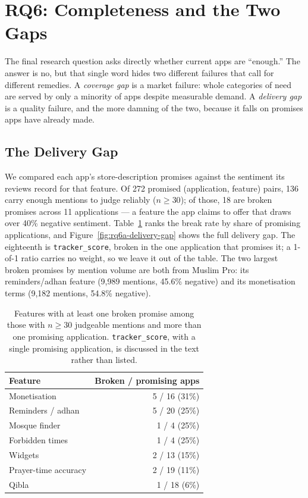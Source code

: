 
\section{RQ6: Completeness and the Two Gaps}
\label{sec:rq6}

The final research question asks directly whether current apps are ``enough.''
The answer is no, but that single word hides two different failures that call
for different remedies. A \emph{coverage gap} is a market failure: whole
categories of need are served by only a minority of apps despite measurable
demand. A \emph{delivery gap} is a quality failure, and the more damning of the
two, because it falls on promises apps have already made.

\subsection{The Delivery Gap}

We compared each app's store-description promises against the sentiment its
reviews record for that feature. Of 272 promised (application, feature)
pairs, 136 carry enough mentions to judge reliably (\(n \geq 30\)); of those,
18 are broken promises across 11 applications --- a feature the app claims to
offer that draws over 40\% negative sentiment. Table~\ref{tab:rq6-broken} ranks
the break rate by share of promising applications, and
Figure~\ref{fig:rq6a-delivery-gap} shows the full delivery gap. The
eighteenth is \texttt{tracker\_score}, broken in the one application that
promises it; a 1-of-1 ratio carries no weight, so we leave it out of the
table. The two largest broken promises by mention volume are both from Muslim
Pro: its reminders/adhan feature (9,989 mentions, 45.6\% negative) and its
monetisation terms (9,182 mentions, 54.8\% negative).

\begin{table}[t]
  \centering
  \small
  \caption{Features with at least one broken promise among those with \(n \geq 30\) judgeable mentions and more than one promising application. \texttt{tracker\_score}, with a single promising application, is discussed in the text rather than listed.}
  \label{tab:rq6-broken}
  \begin{tabular}{lr}
    \toprule
    Feature & Broken / promising apps \\
    \midrule
    Monetisation             & 5 / 16 (31\%) \\
    Reminders / adhan        & 5 / 20 (25\%) \\
    Mosque finder             & 1 / 4 (25\%) \\
    Forbidden times            & 1 / 4 (25\%) \\
    Widgets                    & 2 / 13 (15\%) \\
    Prayer-time accuracy      & 2 / 19 (11\%) \\
    Qibla                      & 1 / 18 (6\%) \\
    \bottomrule
  \end{tabular}
\end{table}

